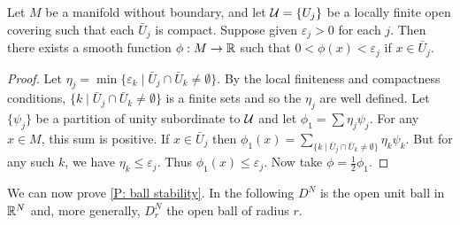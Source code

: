 \begin{lemma}\label{L: minimizer}
Let $M$ be a manifold without boundary, and let $\mathcal{U}=\{U_j\}$ be a locally finite open covering such that each $\bar U_j$ is compact. Suppose given $\varepsilon_j>0$ for each $j$. Then there exists a smooth function $\phi:M\to \mathbb{R}$ such that $0<\phi(x)<\varepsilon_j$ if $x\in \bar U_j$.
\end{lemma}
\begin{proof}
Let $\eta_j=\min\{\varepsilon_k\mid \bar U_j\cap \bar U_k\neq \emptyset\}$. By the local finiteness and compactness conditions, $\{k\mid \bar U_j\cap \bar U_k\neq \emptyset\}$ is a finite sets and so the $\eta_j$ are well defined. Let $\{\psi_j\}$ be a partition of unity subordinate to $\mathcal{U}$ and let $\phi_1=\sum \eta_j\psi_j$. For any $x\in M$, this sum is positive. If $x\in \bar U_j$ then $\phi_1(x)=\sum_{\{k\mid \bar U_j\cap \bar U_k\neq \emptyset\}} \eta_k\psi_k$. But for any such $k$, we have $\eta_k\leq \varepsilon_j$. Thus $\phi_1(x)\leq \varepsilon_j$. Now take $\phi=\frac{1}{2}\phi_1$.
\end{proof}



We can now prove \cref{P: ball stability}.
In the following $D^N$ is the open unit ball in $\mathbb{R}^N$ and, more generally, $D^N_r$ the open ball of radius $r$.



